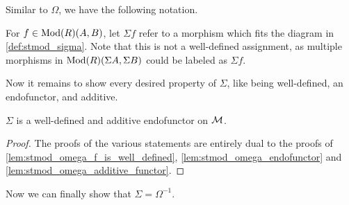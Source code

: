Similar to \( \Omega \), we have the following notation.
\begin{notation}
    For \( f \in \operatorname{Mod}(R)(A, B) \), let \( \Sigma f \) refer to a morphism which fits the diagram in \autoref{def:stmod_sigma}. Note that this is not a well-defined assignment, as multiple morphisms in \( \operatorname{Mod}(R)(\Sigma A, \Sigma B) \) could be labeled as \( \Sigma f \).
\end{notation}

Now it remains to show every desired property of \( \Sigma \), like being well-defined, an endofunctor, and additive.
\begin{lemma}
    \label{lem:stmod_sigma_well-defined_additive_endofunctor}
    \( \Sigma \) is a well-defined and additive endofunctor on \( {\mathcal{M}} \).
\end{lemma}
\begin{proof}
    The proofs of the various statements are entirely dual to the proofs of \autoref{lem:stmod_omega_f_is_well_defined}, \autoref{lem:stmod_omega_endofunctor} and \autoref{lem:stmod_omega_additive_functor}.
\end{proof}

Now we can finally show that \( \Sigma = \Omega^{-1} \).

